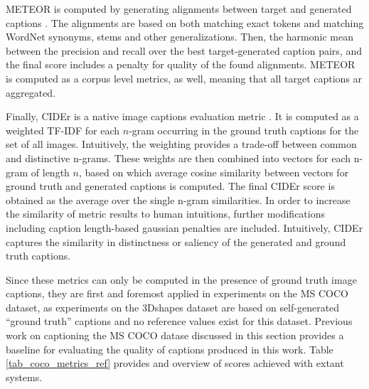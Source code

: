 METEOR is computed by generating alignments between target and generated captions \parencite{banerjee2005meteor}. The alignments are based on both matching exact tokens and matching WordNet synonyms, stems and other generalizations. Then, the harmonic mean between the precision and recall over the best target-generated caption pairs, and the final score includes a penalty for quality of the found alignments. METEOR is computed as a corpus level metrics, as well, meaning that all target captions ar aggregated.
 
Finally, CIDEr is a native image captions evaluation metric \parencite{vedantam2015cider}. It is computed as a weighted TF-IDF for each $n$-gram occurring in the ground truth captions for the set of all images. Intuitively, the weighting provides a trade-off between common and distinctive n-grams. These weights are then combined into vectors for each n-gram of length $n$, based on which average cosine similarity between vectors for ground truth and generated captions is computed. The final CIDEr score is obtained as the average over the single n-gram similarities. In order to increase the similarity of metric results to human intuitions, further modifications including caption length-based gaussian penalties are included. Intuitively, CIDEr captures the similarity in distinctness or saliency of the generated and ground truth captions.


Since these metrics can only be computed in the presence of ground truth image captions, they are first and foremost applied in experiments on the MS COCO dataset, as experiments on the 3Dshapes dataset are based on self-generated ``ground truth'' captions and no reference values exist for this dataset.
Previous work on captioning the MS COCO datase discussed in this section provides a baseline for evaluating the quality of captions produced in this work. Table \ref{tab_coco_metrics_ref} provides and overview of scores achieved with extant systems.

